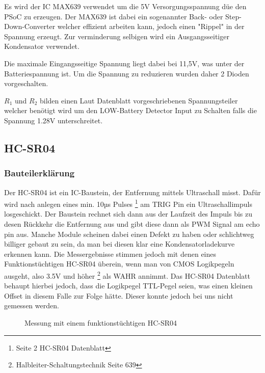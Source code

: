 \documentclass[12pt,a4paper,german]{article}
\begin{document}
Es wird der IC MAX639 verwendet um die 5V Versorgungsspannung düe den PSoC zu
erzeugen. Der MAX639 ist dabei ein sogenannter Back- oder Step-Down-Converter
welcher effizient arbeiten kann, jedoch einen "Rippel" in der Spannung erzeugt.
Zur verminderung selbigen wird ein Ausgangsseitiger Kondensator verwendet.

Die maximale Eingangsseitige Spannung liegt dabei bei 11,5V, was unter der
Batteriespannung ist. Um die Spannung zu reduzieren wurden daher 2 Dioden
vorgeschalten.

$R_1$ und $R_2$ bilden einen Laut Datenblatt vorgeschriebenen Spannungsteiler
welcher benötigt wird um den LOW-Battery Detector Input zu Schalten falls
die Spannung 1.28V unterschreitet.

\subsection{HC-SR04}

\subsubsection{Bauteilerklärung}
	
	Der HC-SR04 ist ein IC-Baustein, der Entfernung mittels Ultraschall
	misst. Dafür wird nach anlegen eines min. 10µs Pulses
	\footnote{Seite 2 HC-SR04 Datenblatt}
	am TRIG Pin
	ein Ultraschallimpuls losgeschickt. Der Baustein rechnet sich dann aus
	der Laufzeit des Impuls bis zu desen Rückkehr die Entfernung aus und
	gibt diese dann als PWM Signal am echo pin aus. Manche
	Module scheinen dabei einen Defekt zu haben oder schlichtweg billiger
	gebaut zu sein, da man bei diesen klar eine Kondensatorladekurve
	erkennen kann. Die Messergebnisse stimmen jedoch mit denen eines
	Funktionstüchtigen HC-SR04 überein, wenn man von CMOS Logikpegeln
	ausgeht, also 3.5V und höher
	\footnote{Halbleiter-Schaltungstechnik Seite 639} als 
	WAHR annimmt. Das HC-SR04 Datenblatt behaupt hierbei jedoch, dass die
	Logikpegel TTL-Pegel seien, was einen kleinen Offset in diesem Falle
	zur Folge hätte. Dieser konnte jedoch bei uns nicht gemessen werden.
	

	\begin{figure}[H]
		
		\centering
		\label{fig:hc-sr04_working}

		\caption{Messung mit einem funktionstüchtigen HC-SR04}
	\end{figure}
	
\end{document}
